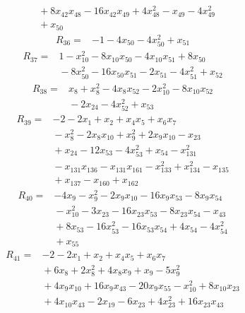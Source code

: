 {\begin{align*}
&{}  + 8x_{42} x_{48} - 16x_{42} x_{49} + 4x_{48}^{2} - x_{49} - 4x_{49}^{2} \\
&{}  + x_{50}
\end{align*}
\begin{align*}
R_{36} ={}& -1 - 4x_{50} - 4x_{50}^{2} + x_{51}
\end{align*}
\begin{align*}
R_{37} ={}& 1 - x_{10}^{2} - 8x_{10} x_{50} - 4x_{10} x_{51} + 8x_{50} \\
&{}  - 8x_{50}^{2} - 16x_{50} x_{51} - 2x_{51} - 4x_{51}^{2} + x_{52}
\end{align*}
\begin{align*}
R_{38} ={}& x_{8} + x_{8}^{2} - 4x_{8} x_{52} - 2x_{10}^{2} - 8x_{10} x_{52} \\
&{}  - 2x_{24} - 4x_{52}^{2} + x_{53}
\end{align*}
\begin{align*}
R_{39} ={}& -2 - 2x_{1} + x_{2} + x_{4} x_{5} + x_{6} x_{7} \\
&{}  - x_{8}^{2} - 2x_{8} x_{10} + x_{9}^{2} + 2x_{9} x_{10} - x_{23} \\
&{}  + x_{24} - 12x_{53} - 4x_{53}^{2} + x_{54} - x_{131}^{2} \\
&{}  - x_{131} x_{136} - x_{131} x_{161} - x_{133}^{2} + x_{134}^{2} - x_{135} \\
&{}  + x_{137} - x_{160} + x_{162}
\end{align*}
\begin{align*}
R_{40} ={}& -4x_{9} - x_{9}^{2} - 2x_{9} x_{10} - 16x_{9} x_{53} - 8x_{9} x_{54} \\
&{}  - x_{10}^{2} - 3x_{23} - 16x_{23} x_{53} - 8x_{23} x_{54} - x_{43} \\
&{}  + 8x_{53} - 16x_{53}^{2} - 16x_{53} x_{54} + 4x_{54} - 4x_{54}^{2} \\
&{}  + x_{55}
\end{align*}
\begin{align*}
R_{41} ={}& -2 - 2x_{1} + x_{2} + x_{4} x_{5} + x_{6} x_{7} \\
&{}  + 6x_{8} + 2x_{8}^{2} + 4x_{8} x_{9} + x_{9} - 5x_{9}^{2} \\
&{}  + 4x_{9} x_{10} + 16x_{9} x_{43} - 20x_{9} x_{55} - x_{10}^{2} + 8x_{10} x_{23} \\
&{}  + 4x_{10} x_{43} - 2x_{19} - 6x_{23} + 4x_{23}^{2} + 16x_{23} x_{43} \\

\end{align*}}
